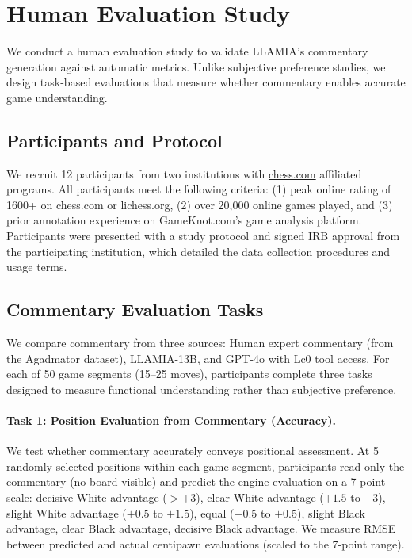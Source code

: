 \section{Human Evaluation Study}
\label{sec:human_study}

We conduct a human evaluation study to validate LLAMIA's commentary generation against automatic metrics. Unlike subjective preference studies, we design task-based evaluations that measure whether commentary enables accurate game understanding.


\subsection{Participants and Protocol}
\label{sec:study_participants}


We recruit 12 participants from two institutions with \url{chess.com} affiliated programs. All participants meet the following criteria: (1) peak online rating of 1600+ on chess.com or lichess.org, (2) over 20,000 online games played, and (3) prior annotation experience on GameKnot.com's game analysis platform. Participants were presented with a study protocol and signed IRB approval from the participating institution, which detailed the data collection procedures and usage terms.


\subsection{Commentary Evaluation Tasks}
\label{sec:commentary_tasks}


We compare commentary from three sources: Human expert commentary (from the Agadmator dataset), LLAMIA-13B, and GPT-4o with Lc0 tool access. For each of 50 game segments (15--25 moves), participants complete three tasks designed to measure functional understanding rather than subjective preference.

\paragraph{Task 1: Position Evaluation from Commentary (Accuracy).}
We test whether commentary accurately conveys positional assessment. At 5 randomly selected positions within each game segment, participants read only the commentary (no board visible) and predict the engine evaluation on a 7-point scale: decisive White advantage ($> +3$), clear White advantage ($+1.5$ to $+3$), slight White advantage ($+0.5$ to $+1.5$), equal ($-0.5$ to $+0.5$), slight Black advantage, clear Black advantage, decisive Black advantage. We measure RMSE between predicted and actual centipawn evaluations (scaled to the 7-point range).

